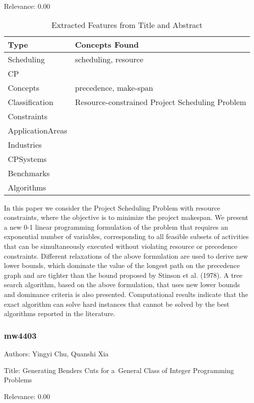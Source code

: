 Relevance:  0.00

{\scriptsize
\begin{longtable}{p{2cm}p{20cm}}
\caption{Extracted Features from Title and Abstract}\\ \toprule
Type & Concepts Found\\ \midrule
\endhead
\bottomrule
\endfoot
Scheduling & scheduling, resource\\ 
CP & \\ 
Concepts & precedence, make-span\\ 
Classification & Resource-constrained Project Scheduling Problem\\ 
Constraints & \\ 
ApplicationAreas & \\ 
Industries & \\ 
CPSystems & \\ 
Benchmarks & \\ 
Algorithms & \\ 
\end{longtable}
}

  In this paper we consider the Project Scheduling Problem with resource constraints, where the objective is to minimize the project makespan. We present a new 0-1 linear programming formulation of the problem that requires an exponential number of variables, corresponding to all feasible subsets of activities that can be simultaneously executed without violating resource or precedence constraints. Different relaxations of the above formulation are used to derive new lower bounds, which dominate the value of the longest path on the precedence graph and are tighter than the bound proposed by Stinson et al. (1978).    A tree search algorithm, based on the above formulation, that uses new lower bounds and dominance criteria is also presented. Computational results indicate that the exact algorithm can solve hard instances that cannot be solved by the best algorithms reported in the literature.  

\subsubsection{mw4403}
\label{mw:mw4403}

Authors: Yingyi Chu, Quanshi Xia

Title: Generating Benders Cuts for a General Class of Integer Programming Problems

Relevance:  0.00

